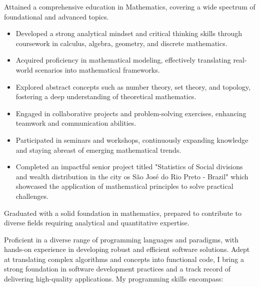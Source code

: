 \documentclass[10pt,a4paper,ragged2e,withhyper,academicons]{altacv}
\begin{document}
\begin{paracol}{1}
Attained a comprehensive education in Mathematics, covering a wide spectrum of foundational and advanced topics.
\begin{itemize}
    \item Developed a strong analytical mindset and critical thinking skills through coursework in calculus, algebra, geometry, and discrete mathematics.
    \item Acquired proficiency in mathematical modeling, effectively translating real-world scenarios into mathematical frameworks.
    \item Explored abstract concepts such as number theory, set theory, and topology, fostering a deep understanding of theoretical mathematics.
    \item Engaged in collaborative projects and problem-solving exercises, enhancing teamwork and communication abilities.
    \item Participated in seminars and workshops, continuously expanding knowledge and staying abreast of emerging mathematical trends.
    \item Completed an impactful senior project titled "Statistics of Social divisions and wealth distribution in the city os S\~ao Jos\'e do Rio Preto - Brazil" which showcased the application of mathematical principles to solve practical challenges.
\end{itemize}
Graduated with a solid foundation in mathematics, prepared to contribute to diverse fields requiring analytical and quantitative expertise.


Proficient in a diverse range of programming languages and paradigms, with hands-on experience in developing robust and efficient software solutions. Adept at translating complex algorithms and concepts into functional code, I bring a strong foundation in software development practices and a track record of delivering high-quality applications. My programming skills encompass:


\end{paracol}
\end{document}
